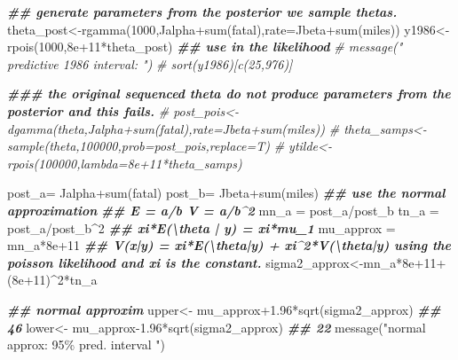 \documentclass[
]{book}
\newenvironment{Shaded}{\begin{snugshade}}{\end{snugshade}}
\newcommand{\AttributeTok}[1]{\textcolor[rgb]{0.77,0.63,0.00}{#1}}
\newcommand{\CommentTok}[1]{\textcolor[rgb]{0.56,0.35,0.01}{\textit{#1}}}
\newcommand{\DecValTok}[1]{\textcolor[rgb]{0.00,0.00,0.81}{#1}}
\newcommand{\DocumentationTok}[1]{\textcolor[rgb]{0.56,0.35,0.01}{\textbf{\textit{#1}}}}
\newcommand{\FloatTok}[1]{\textcolor[rgb]{0.00,0.00,0.81}{#1}}
\newcommand{\FunctionTok}[1]{\textcolor[rgb]{0.00,0.00,0.00}{#1}}
\newcommand{\NormalTok}[1]{#1}
\newcommand{\OtherTok}[1]{\textcolor[rgb]{0.56,0.35,0.01}{#1}}
\newcommand{\SpecialCharTok}[1]{\textcolor[rgb]{0.00,0.00,0.00}{#1}}
\newcommand{\StringTok}[1]{\textcolor[rgb]{0.31,0.60,0.02}{#1}}
\theoremstyle{definition}
\theoremstyle{definition}
\theoremstyle{definition}
\theoremstyle{definition}
\theoremstyle{remark}
\begin{document}
\begin{Shaded}
\begin{Highlighting}[]
 \DocumentationTok{\#\# generate parameters from the posterior we sample thetas.}
\NormalTok{  theta\_post}\OtherTok{\textless{}{-}}\FunctionTok{rgamma}\NormalTok{(}\DecValTok{1000}\NormalTok{,Jalpha}\SpecialCharTok{+}\FunctionTok{sum}\NormalTok{(fatal),}\AttributeTok{rate=}\NormalTok{Jbeta}\SpecialCharTok{+}\FunctionTok{sum}\NormalTok{(miles))}
\NormalTok{  y1986}\OtherTok{\textless{}{-}}\FunctionTok{rpois}\NormalTok{(}\DecValTok{1000}\NormalTok{,}\FloatTok{8e+11}\SpecialCharTok{*}\NormalTok{theta\_post) }\DocumentationTok{\#\# use in the likelihood}
 \CommentTok{\# message(" predictive 1986 interval: ")}
 \CommentTok{\# sort(y1986)[c(25,976)]}
  
  
\DocumentationTok{\#\#\# the original sequenced theta do not produce parameters from the posterior and this fails.  }
  \CommentTok{\# post\_pois\textless{}{-}dgamma(theta,Jalpha+sum(fatal),rate=Jbeta+sum(miles))}
 \CommentTok{\# theta\_samps\textless{}{-}sample(theta,100000,prob=post\_pois,replace=T)}
  \CommentTok{\# ytilde\textless{}{-}rpois(100000,lambda=8e+11*theta\_samps) }
  
  
\NormalTok{  post\_a}\OtherTok{=}\NormalTok{ Jalpha}\SpecialCharTok{+}\FunctionTok{sum}\NormalTok{(fatal)}
\NormalTok{  post\_b}\OtherTok{=}\NormalTok{ Jbeta}\SpecialCharTok{+}\FunctionTok{sum}\NormalTok{(miles)}
   \DocumentationTok{\#\# use the normal approximation}
   \DocumentationTok{\#\# E = a/b  V = a/b\^{}2}
\NormalTok{   mn\_a }\OtherTok{=}\NormalTok{ post\_a}\SpecialCharTok{/}\NormalTok{post\_b}
\NormalTok{   tn\_a }\OtherTok{=}\NormalTok{ post\_a}\SpecialCharTok{/}\NormalTok{post\_b}\SpecialCharTok{\^{}}\DecValTok{2}
   \DocumentationTok{\#\# xi*E(\textbackslash{}theta | y) = xi*mu\_1}
\NormalTok{   mu\_approx }\OtherTok{=}\NormalTok{ mn\_a}\SpecialCharTok{*}\FloatTok{8e+11}
   \DocumentationTok{\#\# V(x|y) = xi*E(\textbackslash{}theta|y) + xi\^{}2*V(\textbackslash{}theta|y) using the poisson likelihood and xi is the constant.}
\NormalTok{   sigma2\_approx}\OtherTok{\textless{}{-}}\NormalTok{mn\_a}\SpecialCharTok{*}\FloatTok{8e+11}\SpecialCharTok{+}\NormalTok{(}\FloatTok{8e+11}\NormalTok{)}\SpecialCharTok{\^{}}\DecValTok{2}\SpecialCharTok{*}\NormalTok{tn\_a}

   \DocumentationTok{\#\# normal approxim}
\NormalTok{ upper}\OtherTok{\textless{}{-}}\NormalTok{ mu\_approx}\FloatTok{+1.96}\SpecialCharTok{*}\FunctionTok{sqrt}\NormalTok{(sigma2\_approx) }\DocumentationTok{\#\# 46}
\NormalTok{ lower}\OtherTok{\textless{}{-}}\NormalTok{ mu\_approx}\FloatTok{{-}1.96}\SpecialCharTok{*}\FunctionTok{sqrt}\NormalTok{(sigma2\_approx) }\DocumentationTok{\#\# 22}
 \FunctionTok{message}\NormalTok{(}\StringTok{"normal approx: 95\% pred. interval "}\NormalTok{)}
\end{Highlighting}
\end{Shaded}
\end{document}
